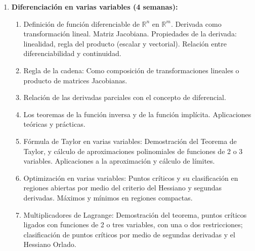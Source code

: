 \begin{refsection}
\begin{enumerate}
\item \textbf{Diferenciaci\'on en varias variables (4 semanas):}
\begin{enumerate}
\item Definición de función diferenciable de $\mathbb{R}^n$ en $\mathbb{R}^m$.  Derivada como transformación lineal.  Matriz Jacobiana. Propiedades de la derivada: linealidad, regla del producto (escalar y vectorial).  Relación entre diferenciabilidad y continuidad.
\item Regla de la cadena: Como composición de transformaciones lineales o producto de matrices Jacobianas.
\item Relación de las derivadas parciales con el concepto de diferencial.
\item Los teoremas de la función inversa y de la función implícita. Aplicaciones teóricas y prácticas.
\item Fórmula de Taylor en varias variables: Demostración del Teorema de Taylor, y cálculo de aproximaciones polinomiales de funciones de 2 o 3 variables.  Aplicaciones a la aproximación y cálculo de límites.
\item Optimización en varias variables: Puntos críticos y su clasificación en regiones abiertas por medio del criterio del Hessiano y segundas derivadas. Máximos y mínimos en regiones compactas.
\item Multiplicadores de Lagrange: Demostración del teorema, puntos críticos ligados con funciones de 2 o tres variables, con una o dos restricciones; clasificación de puntos críticos por medio de segundas derivadas y el Hessiano Orlado.
\end{enumerate}






\end{enumerate}
\end{refsection}

